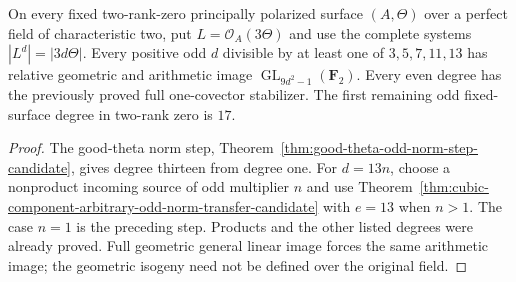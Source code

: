 \begin{corollary}
\label{cor:f0-odd-multiples-thirteen-candidate}
On every fixed two-rank-zero principally polarized surface $(A,\Theta)$
over a perfect field of characteristic two, put
$L=\mathcal O_A(3\Theta)$ and use the complete systems
$|L^d|=|3d\Theta|$. Every positive odd $d$ divisible by at least one
of $3,5,7,11,13$ has relative geometric and arithmetic image
$\operatorname{GL}_{9d^2-1}(\mathbf F_2)$. Every even degree has
the previously proved full one-covector stabilizer. The first
remaining odd fixed-surface degree in two-rank zero is $17$.
\end{corollary}
\begin{proof}
The good-theta norm step, Theorem~\ref{thm:good-theta-odd-norm-step-candidate},
gives degree thirteen from degree one. For $d=13n$, choose a
nonproduct incoming source of odd multiplier $n$ and use
Theorem~\ref{thm:cubic-component-arbitrary-odd-norm-transfer-candidate}
with $e=13$ when $n>1$. The case $n=1$ is the preceding step.
Products and the other listed degrees were already proved. Full
geometric general linear image forces the same arithmetic image;
the geometric isogeny need not be defined over the original field.
\end{proof}

